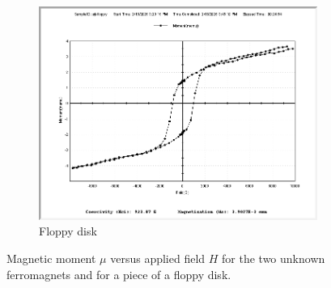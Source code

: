 \documentclass{../paper}
\begin{document}
\begin{figure}
  \begin{subfigure}{\columnwidth}
    \centering
    \includegraphics[width=\textwidth]{data/aij-floppy-2-18-0.png}
    \caption{Floppy disk}
    \label{fig:floppy}
  \end{subfigure}

  \caption{Magnetic moment $\mu$ versus applied field $H$ for the two unknown ferromagnets and for a piece of a floppy disk.}
  \label{fig:AB-curves}
\end{figure}
\end{document}

